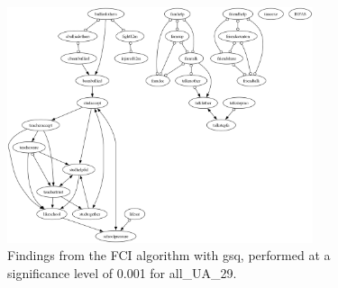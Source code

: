 \begin{figure}[htbp]
    \centering
    \includegraphics[width=0.8\textwidth]{Report/final_report/pictures/FCI_gsq_0.001_all_UA_29.png}
    \caption{Findings from the FCI algorithm with gsq, performed at a significance level of 0.001 for all_UA_29.}
    \label{fig:fci_gsq_0.001all_UA_29}
\end{figure}

